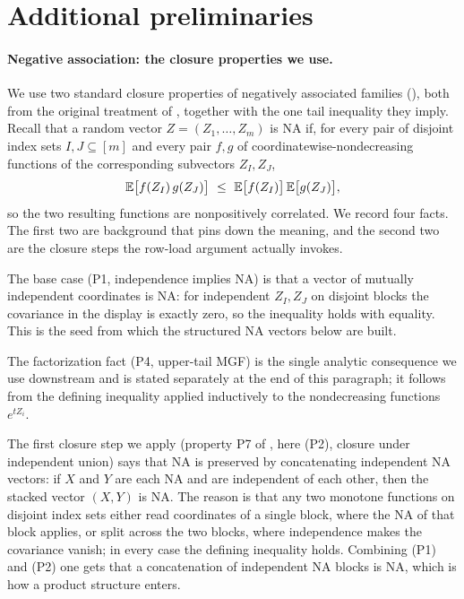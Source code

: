 \section{Additional preliminaries}\label{app:prelims}

\paragraph{Negative association: the closure properties we use.}
We use two standard closure properties of negatively associated families (), both from the original treatment of
\cite{JoagDevProschan1983}, together with the one tail inequality they imply. Recall that a random vector $Z=(Z_1,\dots,Z_m)$
is NA if, for every pair of disjoint index sets $I,J\subseteq[m]$ and every pair $f,g$ of coordinatewise-nondecreasing
functions of the corresponding subvectors $Z_I,Z_J$,
\[
  \E\big[f(Z_I)\,g(Z_J)\big]\ \le\ \E\big[f(Z_I)\big]\,\E\big[g(Z_J)\big],
\]
so the two resulting functions are nonpositively correlated. We record four facts. The first two are background that pins down
the meaning, and the second two are the closure steps the row-load argument actually invokes.

The base case (P1, independence implies NA) is that a vector of mutually independent coordinates is NA: for independent
$Z_I,Z_J$ on disjoint blocks the covariance in the display is exactly zero, so the inequality holds with equality. This is the
seed from which the structured NA vectors below are built.

The factorization fact (P4, upper-tail MGF) is the single analytic consequence we use downstream and is stated separately at
the end of this paragraph; it follows from the defining inequality applied inductively to the nondecreasing functions
$e^{tZ_i}$.

The first closure step we apply (property P7 of \cite{JoagDevProschan1983}, here (P2), closure under independent union) says
that NA is preserved by concatenating independent NA vectors: if $X$ and $Y$ are each NA and are independent of each other,
then the stacked vector $(X,Y)$ is NA. The reason is that any two monotone functions on disjoint index sets either read
coordinates of a single block, where the NA of that block applies, or split across the two blocks, where independence makes
the covariance vanish; in every case the defining inequality holds. Combining (P1) and (P2) one gets that a concatenation of
independent NA blocks is NA, which is how a product structure enters.

